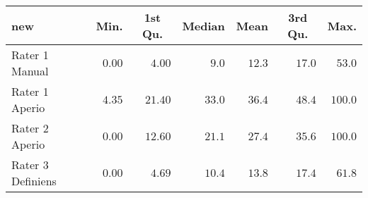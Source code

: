 \begin{table}[!tbp]
\begin{center}
\begin{tabular}{lrrrrrr}
\hline\hline
\multicolumn{1}{l}{new}&\multicolumn{1}{c}{Min.}&\multicolumn{1}{c}{1st Qu.}&\multicolumn{1}{c}{Median}&\multicolumn{1}{c}{Mean}&\multicolumn{1}{c}{3rd Qu.}&\multicolumn{1}{c}{Max.}\tabularnewline
\hline
Rater 1 Manual&$0.00$&$ 4.00$&$ 9.0$&$12.3$&$17.0$&$ 53.0$\tabularnewline
Rater 1 Aperio&$4.35$&$21.40$&$33.0$&$36.4$&$48.4$&$100.0$\tabularnewline
Rater 2 Aperio&$0.00$&$12.60$&$21.1$&$27.4$&$35.6$&$100.0$\tabularnewline
Rater 3 Definiens&$0.00$&$ 4.69$&$10.4$&$13.8$&$17.4$&$ 61.8$\tabularnewline
\hline
\end{tabular}\end{center}

\end{table}
